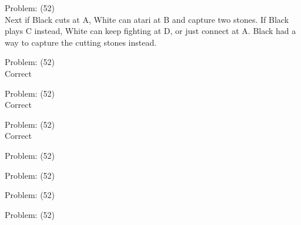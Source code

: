 \documentclass[11pt]{article}
\begin{document}
\begin{minipage}[t]{0.5\textwidth}
  {\centering
  
Problem: (52)\\
Next if Black cuts at A, White can atari at B and capture two stones. If Black plays C instead, White can keep fighting at D, or just connect at A. Black had a way to capture the cutting stones instead.\\
  }
\end{minipage}
\begin{minipage}[t]{0.5\textwidth}
  {\centering
  
Problem: (52)\\
Correct\\
  }
\end{minipage}
\begin{minipage}[t]{0.5\textwidth}
  {\centering
  
Problem: (52)\\
Correct\\
  }
\end{minipage}
\begin{minipage}[t]{0.5\textwidth}
  {\centering
  
Problem: (52)\\
Correct\\
  }
\end{minipage}
\begin{minipage}[t]{0.5\textwidth}
  {\centering
  
Problem: (52)\\
  }
\end{minipage}
\begin{minipage}[t]{0.5\textwidth}
  {\centering
  
Problem: (52)\\
  }
\end{minipage}
\begin{minipage}[t]{0.5\textwidth}
  {\centering
  
Problem: (52)\\
  }
\end{minipage}
\begin{minipage}[t]{0.5\textwidth}
  {\centering
  
Problem: (52)\\
  }
\end{minipage}
\end{document}
